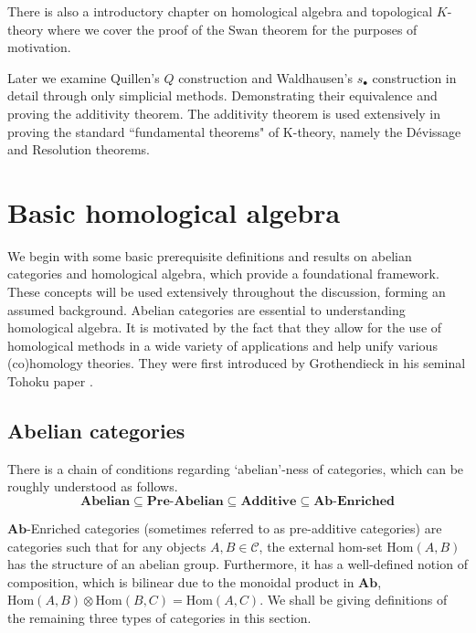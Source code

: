 \documentclass[12pt]{report}
\makeatletter
\numberwithin{equation}{section}
\newcommand{\Hom}{{\mathrm{Hom}}}
\newcommand\mainmatter{%
	\cleardoublepage
	 \@mainmattertrue
	\pagenumbering{arabic}}
\makeatother
\begin{document}
	There is also a introductory chapter on homological algebra and topological \( K \)-theory where we cover the proof of the Swan theorem for the purposes of motivation.
	
	Later we examine Quillen's \( Q \) construction and Waldhausen's \( s_\bullet \) construction in detail through only simplicial methods. Demonstrating their equivalence and proving the additivity theorem. The additivity theorem is used extensively in proving the standard ``fundamental theorems" of K-theory, namely the D\'evissage and Resolution theorems. 
\clearpage
	\tableofcontents
	\mainmatter
	\chapter{Basic homological algebra}
	We begin with some basic prerequisite definitions and results on abelian categories and homological algebra, which provide a foundational framework. These concepts will be used extensively throughout the discussion, forming an assumed background.
	Abelian categories are essential to understanding homological algebra. It is motivated by the fact that they allow for the use of homological methods in a wide variety of applications and help unify various (co)homology theories. They were first introduced by Grothendieck in his seminal Tohoku paper \cite{grothendieck1957quelques}.
	
	\section{Abelian categories}
	There is a chain of conditions regarding `abelian'-ness of categories, which can be roughly understood as follows.
	\[ \textbf{Abelian} \subseteq \textbf{Pre-Abelian} \subseteq \textbf{Additive} \subseteq \textbf{Ab-Enriched}\]
	
	$\mathbf{Ab}$-Enriched categories  (sometimes referred to as pre-additive categories) are categories such that for any objects $A,B \in \mathcal{C}$, the external hom-set $\Hom(A,B)$ has the structure of an abelian group. Furthermore, it has a well-defined notion of composition, which is bilinear due to the monoidal product in $\mathbf{Ab}$, $\Hom(A,B)\otimes \Hom(B,C) =\Hom(A,C)$. We shall be giving definitions of the remaining three types of categories in this section.
	
\end{document}
